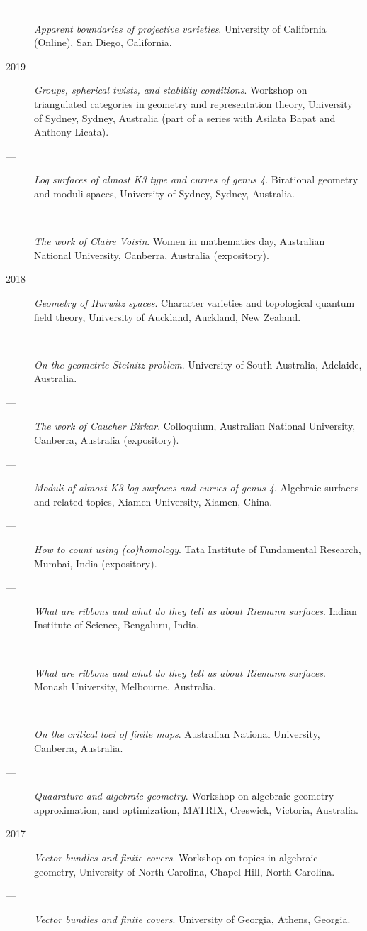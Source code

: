\documentclass[11pt]{article}
\begin{document}
\begin{description}
\item[{---}] \emph{Apparent boundaries of projective varieties}. University of California (Online), San Diego, California.
\item[{2019}] \emph{Groups, spherical twists, and stability conditions}. Workshop on triangulated categories in geometry and representation theory, University of Sydney, Sydney, Australia (part of a series with Asilata Bapat and Anthony Licata).
\item[{---}] \emph{Log surfaces of almost K3 type and curves of genus 4}. Birational geometry and moduli spaces, University of Sydney, Sydney, Australia.
\item[{---}] \emph{The work of Claire Voisin}. Women in mathematics day, Australian National University, Canberra, Australia (expository).
\item[{2018}] \emph{Geometry of Hurwitz spaces}. Character varieties and topological quantum field theory, University of Auckland, Auckland, New Zealand.
\item[{---}] \emph{On the geometric Steinitz problem}. University of South Australia, Adelaide, Australia.
\item[{---}] \emph{The work of Caucher Birkar}. Colloquium, Australian National University, Canberra, Australia (expository).
\item[{---}] \emph{Moduli of almost K3 log surfaces and curves of genus 4}. Algebraic surfaces and related topics, Xiamen University, Xiamen, China.
\item[{---}] \emph{How to count using (co)homology}. Tata Institute of Fundamental Research, Mumbai, India (expository).
\item[{---}] \emph{What are ribbons and what do they tell us about Riemann surfaces}. Indian Institute of Science, Bengaluru, India.
\item[{---}] \emph{What are ribbons and what do they tell us about Riemann surfaces}. Monash University, Melbourne, Australia.
\item[{---}] \emph{On the critical loci of finite maps}. Australian National University, Canberra, Australia.
\item[{---}] \emph{Quadrature and algebraic geometry}. Workshop on algebraic geometry approximation, and optimization, MATRIX, Creswick, Victoria, Australia.
\item[{2017}] \emph{Vector bundles and finite covers}. Workshop on topics in algebraic geometry, University of North Carolina, Chapel Hill, North Carolina.
\item[{---}] \emph{Vector bundles and finite covers}. University of Georgia, Athens, Georgia.

\end{description}
\end{document}
